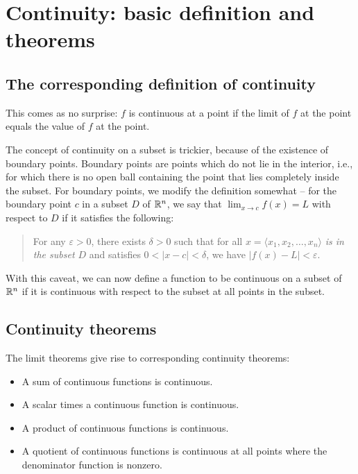 \documentclass[10pt]{amsart}
\begin{document}
\section{Continuity: basic definition and theorems}

\subsection{The corresponding definition of continuity}

This comes as no surprise: $f$ is continuous at a point if the limit
of $f$ at the point equals the value of $f$ at the point.

The concept of continuity on a subset is trickier, because of the
existence of boundary points. Boundary points are points which do not
lie in the interior, i.e., for which there is no open ball containing
the point that lies completely inside the subset. For boundary points,
we modify the definition somewhat -- for the boundary point $c$ in a
subset $D$ of $\mathbb{R}^n$, we say that $\lim_{x \to c} f(x) = L$ with
respect to $D$ if it satisfies the following:

\begin{quote}
  For any $\varepsilon > 0$, there exists $\delta > 0$ such that for all
  $x = \langle x_1,x_2,\dots,x_n \rangle$ {\em is in the subset $D$}
  and satisfies $0 < |x - c| < \delta$, we have $|f(x) - L| <
  \varepsilon$.
\end{quote}

With this caveat, we can now define a function to be continuous on a
subset of $\mathbb{R}^n$ if it is continuous with respect to the subset at all
points in the subset.

\subsection{Continuity theorems}

The limit theorems give rise to corresponding continuity theorems:

\begin{itemize}
\item A sum of continuous functions is continuous.
\item A scalar times a continuous function is continuous.
\item A product of continuous functions is continuous.
\item A quotient of continuous functions is continuous at all points
  where the denominator function is nonzero.
\end{itemize}
\end{document}
